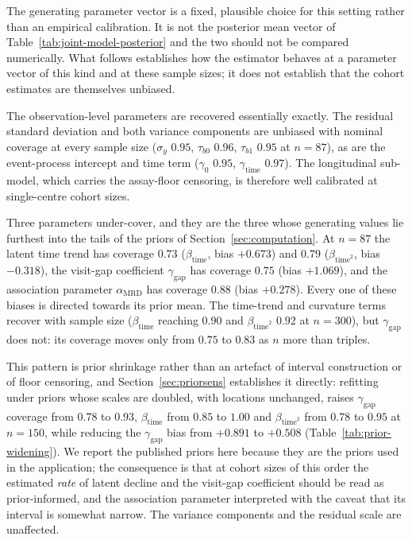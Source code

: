 \documentclass[11pt]{article}
\begin{document}
The generating parameter vector is a fixed, plausible choice for this setting
rather than an empirical calibration. It is not the posterior mean vector of
Table~\ref{tab:joint-model-posterior} and the two should not be compared
numerically. What follows establishes how the estimator behaves at a parameter
vector of this kind and at these sample sizes; it does not establish that the
cohort estimates are themselves unbiased.

The observation-level parameters are recovered essentially exactly. The residual
standard deviation and both variance components are unbiased with nominal
coverage at every sample size ($\sigma_y$ $0.95$, $\tau_{b0}$ $0.96$,
$\tau_{b1}$ $0.95$ at $n=87$), as are the event-process intercept and time term
($\gamma_0$ $0.95$, $\gamma_{\mathrm{time}}$ $0.97$). The longitudinal
sub-model, which carries the assay-floor censoring, is therefore well
calibrated at single-centre cohort sizes.

Three parameters under-cover, and they are the three whose generating values lie
furthest into the tails of the priors of Section~\ref{sec:computation}. At $n=87$ the
latent time trend has coverage $0.73$ ($\beta_{\mathrm{time}}$, bias $+0.673$)
and $0.79$ ($\beta_{\mathrm{time}^2}$, bias $-0.318$), the visit-gap coefficient
$\gamma_{\mathrm{gap}}$ has coverage $0.75$ (bias $+1.069$), and the association
parameter $\alpha_{\mathrm{MRD}}$ has coverage $0.88$ (bias $+0.278$). Every one
of these biases is directed towards its prior mean. The time-trend and curvature
terms recover with sample size ($\beta_{\mathrm{time}}$ reaching $0.90$ and
$\beta_{\mathrm{time}^2}$ $0.92$ at $n=300$), but $\gamma_{\mathrm{gap}}$ does
not: its coverage moves only from $0.75$ to $0.83$ as $n$ more than triples.

This pattern is prior shrinkage rather than an artefact of interval construction
or of floor censoring, and Section~\ref{sec:priorsens} establishes it directly:
refitting under priors whose scales are doubled, with locations unchanged,
raises $\gamma_{\mathrm{gap}}$ coverage from $0.78$ to $0.93$,
$\beta_{\mathrm{time}}$ from $0.85$ to $1.00$ and $\beta_{\mathrm{time}^2}$ from
$0.78$ to $0.95$ at $n=150$, while reducing the $\gamma_{\mathrm{gap}}$ bias
from $+0.891$ to $+0.508$ (Table~\ref{tab:prior-widening}). We report the published priors here because they are
the priors used in the application; the consequence is that at cohort sizes of
this order the estimated \emph{rate} of latent decline and the visit-gap
coefficient should be read as prior-informed, and the association parameter
interpreted with the caveat that its interval is somewhat narrow. The variance
components and the residual scale are unaffected.
\end{document}
